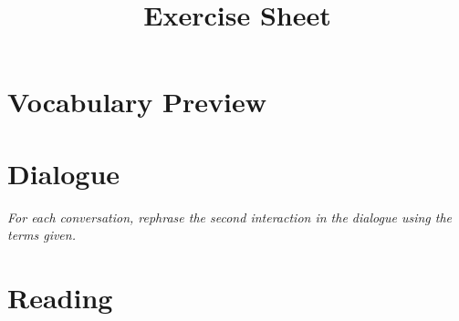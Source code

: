 \documentclass{article}
\title{Exercise Sheet}
\begin{document}
\section{Vocabulary Preview}

%
%
%
%
%
%
%
%
%
%
%
%
%
%
%
%
%
%
%
%


\newpage
\section{Dialogue}

\noindent \textit{For each conversation, rephrase the second interaction in the dialogue using the terms given.}

%
%
%
%
%
%
%
%
%
%
%
%
%
%
%
%
%
%
%
%



\newpage
\section{Reading}


%
%
%
%
%
%
%
%
%
%
%
%
%
%
%
%
%
%
%
%
\end{document}
